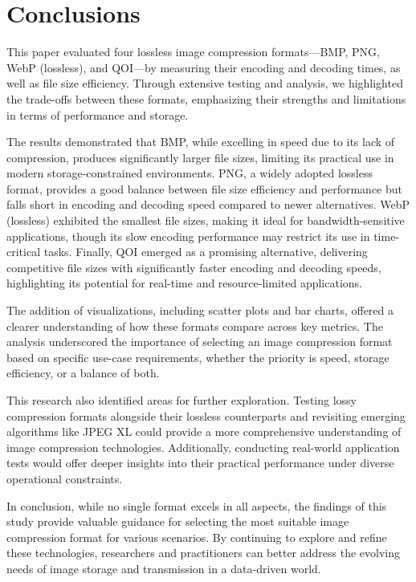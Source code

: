 \documentclass[conference]{IEEEtran}
\begin{document}
\section{Conclusions}

This paper evaluated four lossless image compression formats—BMP, PNG, WebP (lossless), and QOI—by measuring their encoding and decoding times, as well as file size efficiency. Through extensive testing and analysis, we highlighted the trade-offs between these formats, emphasizing their strengths and limitations in terms of performance and storage.

The results demonstrated that BMP, while excelling in speed due to its lack of compression, produces significantly larger file sizes, limiting its practical use in modern storage-constrained environments. PNG, a widely adopted lossless format, provides a good balance between file size efficiency and performance but falls short in encoding and decoding speed compared to newer alternatives. WebP (lossless) exhibited the smallest file sizes, making it ideal for bandwidth-sensitive applications, though its slow encoding performance may restrict its use in time-critical tasks. Finally, QOI emerged as a promising alternative, delivering competitive file sizes with significantly faster encoding and decoding speeds, highlighting its potential for real-time and resource-limited applications.

The addition of visualizations, including scatter plots and bar charts, offered a clearer understanding of how these formats compare across key metrics. The analysis underscored the importance of selecting an image compression format based on specific use-case requirements, whether the priority is speed, storage efficiency, or a balance of both.

This research also identified areas for further exploration. Testing lossy compression formats alongside their lossless counterparts and revisiting emerging algorithms like JPEG XL could provide a more comprehensive understanding of image compression technologies. Additionally, conducting real-world application tests would offer deeper insights into their practical performance under diverse operational constraints.

In conclusion, while no single format excels in all aspects, the findings of this study provide valuable guidance for selecting the most suitable image compression format for various scenarios. By continuing to explore and refine these technologies, researchers and practitioners can better address the evolving needs of image storage and transmission in a data-driven world.
\end{document}
